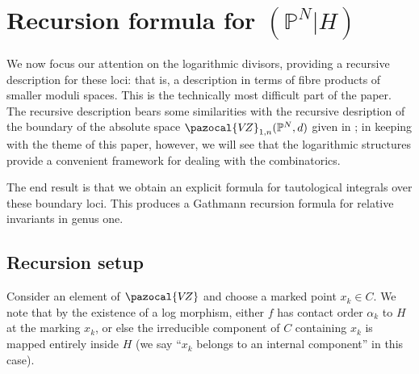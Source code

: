 \documentclass[11pt]{amsart}
\newcommand{\PP}{\mathbb P}
\newcommand{\VZ}{\pazocal{V\!Z}}
\theoremstyle{definition}
\theoremstyle{definition}
\begin{document}
\newpage

\section{Recursion formula for $(\PP^N|H)$}

\noindent 

We now focus our attention on the logarithmic divisors, providing a recursive description for these loci: that is, a description in terms of fibre products of smaller moduli spaces. This is the technically most difficult part of the paper. The recursive description bears some similarities with the recursive desription of the boundary of the absolute space $\VZ_{1,n}(\PP^N,d)$ given in \cite{VZ}; in keeping with the theme of this paper, however, we will see that the logarithmic structures provide a convenient framework for dealing with the combinatorics.

The end result is that we obtain an explicit formula for tautological integrals over these boundary loci. This produces a Gathmann recursion formula for relative invariants in genus one.

\subsection{Recursion setup} Consider an element of $\VZ$ and choose a marked point $x_k\in C$. We note that by the existence of a log morphism, either $f$ has contact order $\alpha_k$ to $H$ at the marking $x_k$, or else the irreducible component of $C$ containing $x_k$ is mapped entirely inside $H$ (we say ``$x_k$ belongs to an internal component'' in this case).
\end{document}
